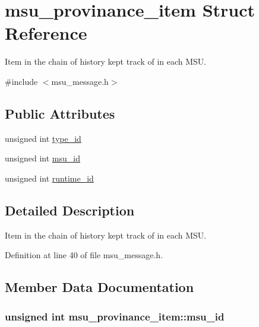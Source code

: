\hypertarget{structmsu__provinance__item}{\section{msu\-\_\-provinance\-\_\-item Struct Reference}
\label{structmsu__provinance__item}
}


Item in the chain of history kept track of in each M\-S\-U.  




{\ttfamily \#include $<$msu\-\_\-message.\-h$>$}

\subsection*{Public Attributes}
\begin{DoxyCompactItemize}
\item 
unsigned int \hyperlink{structmsu__provinance__item_a87a273f0d05488e4421a712399b17b8d}{type\-\_\-id}
\item 
unsigned int \hyperlink{structmsu__provinance__item_a415436a43ba850f618873cb9c3e3a18b}{msu\-\_\-id}
\item 
unsigned int \hyperlink{structmsu__provinance__item_a03aec79bc90a021ad1d4ef1d2c3296e3}{runtime\-\_\-id}
\end{DoxyCompactItemize}


\subsection{Detailed Description}
Item in the chain of history kept track of in each M\-S\-U. 

Definition at line 40 of file msu\-\_\-message.\-h.



\subsection{Member Data Documentation}
\hypertarget{structmsu__provinance__item_a415436a43ba850f618873cb9c3e3a18b}{
\subsubsection[{msu\-\_\-id}]{\setlength{\rightskip}{0pt plus 5cm}unsigned int msu\-\_\-provinance\-\_\-item\-::msu\-\_\-id}}\label{structmsu__provinance__item_a415436a43ba850f618873cb9c3e3a18b}


